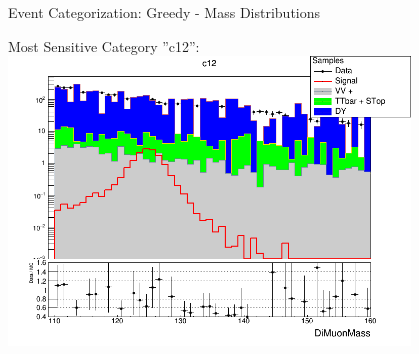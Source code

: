 \documentclass[pdf, 9pt]{beamer}
\begin{document}
  \begin{frame}{Event Categorization: Greedy - Mass Distributions}
    \begin{center}
      Most Sensitive Category ''c12'':\\\vspace{0.2cm}
      \includegraphics[width=0.8\textwidth, height=0.8\textheight]{figs/higgs/distributions/bdt_uf/distribution__c12__DiMuonMass__logY.png}
    \end{center}
  \end{frame}
\end{document}
